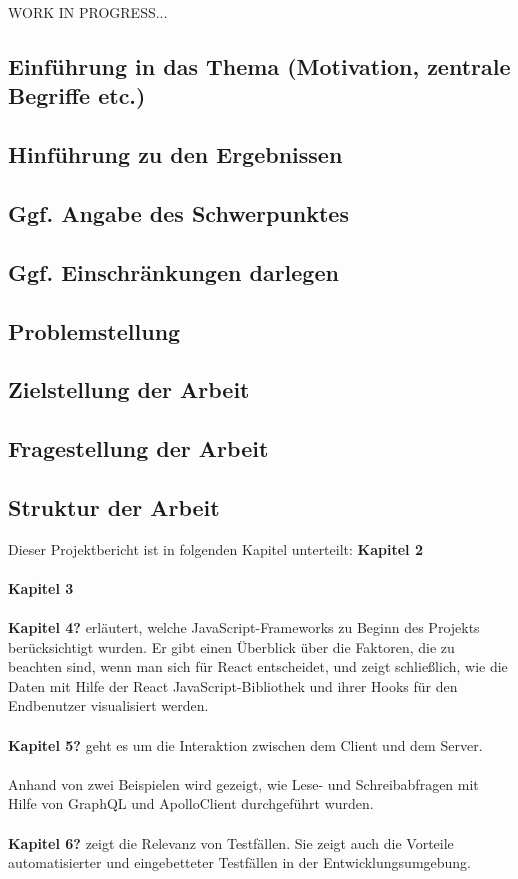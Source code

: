 WORK IN PROGRESS...

\subsection{Einführung in das Thema (Motivation, zentrale Begriffe etc.)}
\subsection{Hinführung zu den Ergebnissen}
\subsection{Ggf. Angabe des Schwerpunktes}
\subsection{ Ggf. Einschränkungen darlegen}
\subsection{Problemstellung}
\subsection{Zielstellung der Arbeit}
\subsection{Fragestellung der Arbeit}

\subsection{Struktur der Arbeit}
Dieser Projektbericht ist in folgenden Kapitel unterteilt:
\textbf{Kapitel 2}
\\\\
\textbf{Kapitel 3}
\\\\
\textbf{Kapitel 4?} erläutert, welche JavaScript-Frameworks zu Beginn des Projekts berücksichtigt wurden. Er gibt einen Überblick über die Faktoren, die zu beachten sind, wenn man sich für React entscheidet, und zeigt schließlich, wie die Daten mit Hilfe der React JavaScript-Bibliothek und ihrer Hooks für den Endbenutzer visualisiert werden.
\\\\
\textbf{Kapitel 5?} geht es um die Interaktion zwischen dem Client und dem Server. 
\\\\
Anhand von zwei Beispielen wird gezeigt, wie Lese- und Schreibabfragen mit Hilfe von GraphQL und ApolloClient durchgeführt wurden.
\\\\
\textbf{Kapitel 6?} zeigt die Relevanz von Testfällen. Sie zeigt auch die Vorteile automatisierter und eingebetteter Testfällen in der Entwicklungsumgebung.
\\